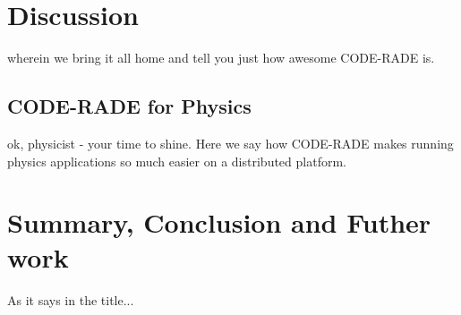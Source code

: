 \documentclass[a4paper]{jpconf}
\begin{document}
	\section{Discussion}\label{Discussion}

	wherein we bring it all home and tell you just how awesome CODE-RADE is.


	\subsection{CODE-RADE for Physics}

	ok, physicist - your time to shine. Here we say how CODE-RADE makes running physics applications so much easier on a distributed platform.

	\section{Summary, Conclusion and Futher work}

	As it says in the title...
\end{document}

